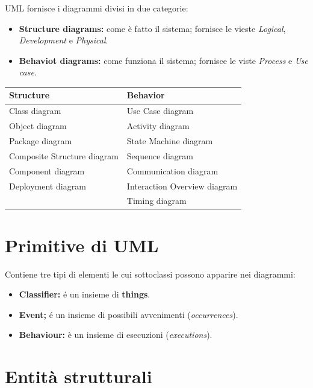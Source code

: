 \documentclass[]{article}
\providecommand{\tightlist}{%
  \setlength{\itemsep}{0pt}\setlength{\parskip}{0pt}}
\begin{document}
UML fornisce i diagrammi divisi in due categorie:

\begin{itemize}
\item
  \textbf{Structure diagrams:} come è fatto il sistema; fornisce le
  vieste \emph{Logical}, \emph{Development} e \emph{Physical}.
\item
  \textbf{Behaviot diagrams:} come funziona il sistema; fornisce le
  viste \emph{Process} e \emph{Use case}.
\end{itemize}

\begin{longtable}[]{@{}ll@{}}
\toprule
Structure & Behavior\tabularnewline
\midrule
\endhead
Class diagram & Use Case diagram\tabularnewline
Object diagram & Activity diagram\tabularnewline
Package diagram & State Machine diagram\tabularnewline
Composite Structure diagram & Sequence diagram\tabularnewline
Component diagram & Communication diagram\tabularnewline
Deployment diagram & Interaction Overview diagram\tabularnewline
& Timing diagram\tabularnewline
\bottomrule
\end{longtable}

\hypertarget{primitive-di-uml}{%
\section{Primitive di UML}\label{primitive-di-uml}}

Contiene tre tipi di elementi le cui sottoclassi possono apparire nei
diagrammi:

\begin{itemize}
\tightlist
\item
  \textbf{Classifier:} é un insieme di \textbf{things}.
\item
  \textbf{Event;} é un insieme di possibili avvenimenti
  (\emph{occurrences}).
\item
  \textbf{Behaviour:} è un insieme di esecuzioni (\emph{executions}).
\end{itemize}

\hypertarget{entita-strutturali}{%
\section{Entità strutturali}\label{entita-strutturali}}
\end{document}
